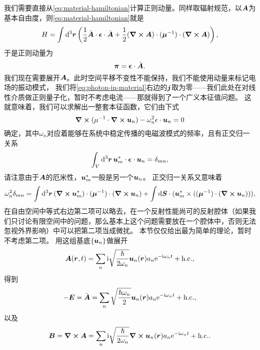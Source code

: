 我们需要直接从\eqref{eq:material-hamiltonian}计算正则动量。同样取辐射规范，以$\vb*{A}$为基本自由度，则\eqref{eq:material-hamiltonian}就是
\begin{equation}
    H = \int \dd[3]{\vb*{r}} \left( \frac{1}{2} \dot{\vb*{A}} \cdot \vb*{\epsilon} \cdot \dot{\vb*{A}} + \frac{1}{2} (\curl{\vb*{A}}) \cdot (\vb*{\mu}^{-1}) \cdot (\curl{\vb*{A}}) \right),
\end{equation}
于是正则动量为
\begin{equation}
    \vb*{\pi} = \vb*{\epsilon} \cdot \dot{\vb*{\vb*{A}}}.
\end{equation}
我们现在需要展开$\vb*{A}$。此时空间平移不变性不能保持，我们不能使用动量来标记电场的振动模式，
我们将\eqref{eq:photon-in-material}右边的$\vb*{j}$取为零——我们此处在对线性介质做正则量子化，暂时不考虑电流——那就得到了一个广义本征值问题。
这就意味着，我们可以求解出一整套本征函数，它们由下式
\begin{equation}
    \curl{(\mu^{-1} \cdot \curl{\vb*{u}_n})} - \omega_n^2 \epsilon \cdot \vb*{u}_n = 0
\end{equation}
确定，其中$\omega_n$对应着能够在系统中稳定传播的电磁波模式的频率，且有正交归一关系
\begin{equation}
    \int_V \dd[3]{\vb*{r}} \vb*{u}^*_m \cdot \vb*{\epsilon} \cdot \vb*{u}_n = \delta_{mn}, 
\end{equation}
请注意由于$\vb*{A}$的厄米性，$\vb*{u}_m^*$一般是另一个$\vb*{u}_n$。
正交归一关系又意味着
\begin{equation}
    \omega_n^2 \delta_{mn} = \int \dd[3]{\vb*{r}} (\curl{\vb*{u}_m^*}) \cdot (\vb*{\mu}^{-1}) \cdot (\curl{\vb*{u}_n}) + \int \dd{\vb*{S}} \cdot (\vb*{u}_m^* \times ((\vb*{\mu}^{-1}) \cdot (\curl{\vb*{u}_n}))),
\end{equation}
在自由空间中等式右边第二项可以略去，在一个反射性能尚可的反射腔体（如果我们只讨论有限空间中的问题，那么基本上这个问题需要放在一个腔体中，否则无法忽视外界影响）中可以把第二项当成微扰。
本节仅仅给出最为简单的理论，暂时不考虑第二项。
用这组基底$\{\vb*{u}_n\}$做展开
\begin{equation}
    \vb*{A}(\vb*{r}, t) = \sum_n \mathrm{i} \sqrt{\frac{\hbar}{2\omega_{n}}} \vb*{u}_n(\vb*{r}) a_n \mathrm{e}^{- \mathrm{i} \omega_n t} + \text{h.c.},
\end{equation}
得到
\begin{equation}
    - \vb*{E} = \dot{\vb*{A}} = \sum_n \sqrt{\frac{\hbar \omega_n}{2}} \vb*{u}_n(\vb*{r}) a_n \mathrm{e}^{-\mathrm{i} \omega_n t} + \text{h.c.},
\end{equation}
以及
\begin{equation}
    \vb*{B} = \curl{\vb*{A}} = \sum_n \mathrm{i} \sqrt{\frac{\hbar}{2\omega_n}} \curl{\vb*{u}_n(\vb*{r})} a_n \mathrm{e}^{-\mathrm{i} \omega_n t} + \text{h.c.}.
\end{equation}
